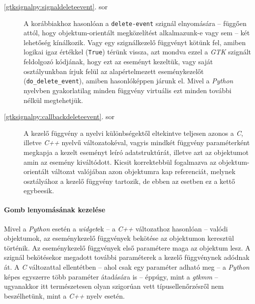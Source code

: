 \begin{description}
 \item[\ref{gtksignalpy:signaldeleteevent}. sor] A korábbiakhoz hasonlóan a \texttt{delete-event} szignál elnyomására -- függően attól, hogy objektum-orientált megközelítést alkalmazunk-e vagy sem -- két lehetőség kínálkozik. Vagy egy szignálkezelő függvényt kötünk fel, amiben logikai igaz értékkel (\texttt{True}) térünk vissza, azt mondva ezzel a \textit{GTK} szignált feldolgozó kódjának, hogy ezt az eseményt kezeltük, vagy saját osztályunkban írjuk felül az alapértelmezett eseménykezelőt (\texttt{do\_delete\_event}), amiben hasonlóképpen járunk el. Mivel a \textit{Python} nyelvben gyakorlatilag minden függvény virtuális ezt minden további nélkül megtehetjük.

 \item[\ref{gtksignalpy:callbackdeleteevent}. sor] A kezelő függvény a nyelvi különbségektől eltekintve teljesen azonos a \textit{C}, illetve \textit{C++} nyelvű változatokéval, vagyis mindkét függvény paraméterként megkapja a kezelt eseményt leíró adatstruktúrát, illetve azt az objektumot amin az esemény kiváltódott. Kicsit korrektebbül fogalmazva az objektum-orientált változat valójában azon objektumra kap referenciát, melynek osztályához a kezelő függvény tartozik, de ebben az esetben ez a kettő egybeesik.
\end{description}

\paragraph{Gomb lenyomásának kezelése}

\begin{description}
 \item[\ref{gtksignalpy:connectclicked}. sor] Mivel a \textit{Python} esetén a \textit{widget}ek -- a \textit{C++} változathoz hasonlóan --  valódi objektumok, az eseménykezelő függvények bekötése az objektumon keresztül történik. Az eseménykezelő függvények első paramétere maga az objektum lesz. A szignál bekötésekor megadott további paraméterek a kezelő függvénynek adódnak át. A \textit{C} változattal ellentétben -- ahol csak egy paraméter adható meg -- a \textit{Python} képes egyszerre több paraméter átadására is -- éppúgy, mint a \textit{gtkmm} -- ugyanakkor itt természetesen olyan szigorúan vett típusellenőrzésről nem beszélhetünk, mint a \textit{C++} nyelv esetén.
\end{description}

